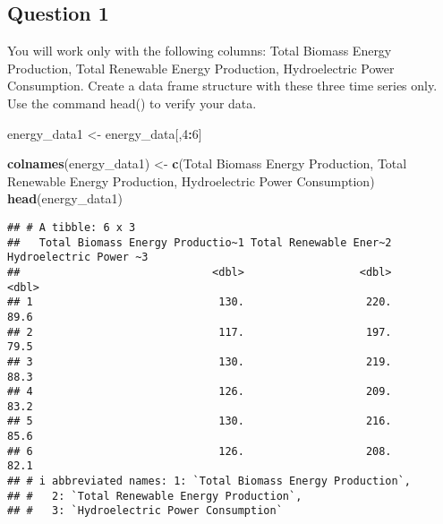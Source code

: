 \documentclass[
]{article}
\newenvironment{Shaded}{\begin{snugshade}}{\end{snugshade}}
\newcommand{\DecValTok}[1]{\textcolor[rgb]{0.00,0.00,0.81}{#1}}
\newcommand{\FunctionTok}[1]{\textcolor[rgb]{0.13,0.29,0.53}{\textbf{#1}}}
\newcommand{\NormalTok}[1]{#1}
\newcommand{\OtherTok}[1]{\textcolor[rgb]{0.56,0.35,0.01}{#1}}
\newcommand{\SpecialCharTok}[1]{\textcolor[rgb]{0.81,0.36,0.00}{\textbf{#1}}}
\newcommand{\StringTok}[1]{\textcolor[rgb]{0.31,0.60,0.02}{#1}}
\begin{document}
\hypertarget{question-1}{%
\subsection{Question 1}\label{question-1}}

You will work only with the following columns: Total Biomass Energy
Production, Total Renewable Energy Production, Hydroelectric Power
Consumption. Create a data frame structure with these three time series
only. Use the command head() to verify your data.

\begin{Shaded}
\begin{Highlighting}[]
\NormalTok{energy\_data1 }\OtherTok{\textless{}{-}}\NormalTok{ energy\_data[,}\DecValTok{4}\SpecialCharTok{:}\DecValTok{6}\NormalTok{]}
\end{Highlighting}
\end{Shaded}

\begin{Shaded}
\begin{Highlighting}[]
\FunctionTok{colnames}\NormalTok{(energy\_data1) }\OtherTok{\textless{}{-}} \FunctionTok{c}\NormalTok{(}\StringTok{\textquotesingle{}Total Biomass Energy Production\textquotesingle{}}\NormalTok{, }\StringTok{\textquotesingle{}Total Renewable Energy Production\textquotesingle{}}\NormalTok{, }\StringTok{\textquotesingle{}Hydroelectric Power Consumption\textquotesingle{}}\NormalTok{)}
\FunctionTok{head}\NormalTok{(energy\_data1)}
\end{Highlighting}
\end{Shaded}

\begin{verbatim}
## # A tibble: 6 x 3
##   Total Biomass Energy Productio~1 Total Renewable Ener~2 Hydroelectric Power ~3
##                              <dbl>                  <dbl>                  <dbl>
## 1                             130.                   220.                   89.6
## 2                             117.                   197.                   79.5
## 3                             130.                   219.                   88.3
## 4                             126.                   209.                   83.2
## 5                             130.                   216.                   85.6
## 6                             126.                   208.                   82.1
## # i abbreviated names: 1: `Total Biomass Energy Production`,
## #   2: `Total Renewable Energy Production`,
## #   3: `Hydroelectric Power Consumption`
\end{verbatim}
\end{document}
